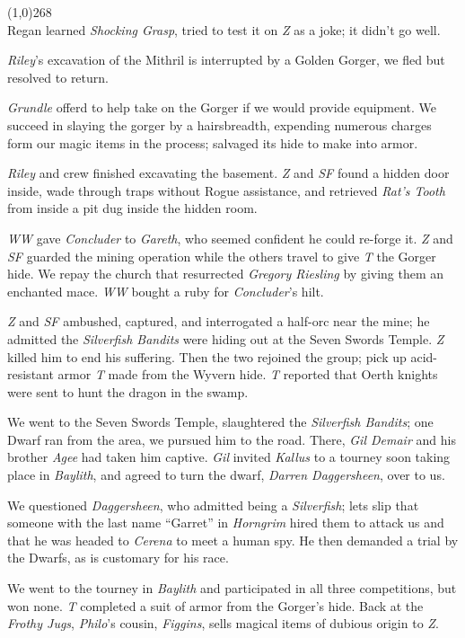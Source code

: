 \documentclass[letterpaper]{article}
\newcommand{\colline}{\noindent\line(1,0){268} \\}
\newcommand{\e}[1]{\emph{#1}}
\newcommand{\B}[1]{\textbf{#1}}
\newenvironment{notesection}[1]
{\noindent {\huge \B{#1}} \par
\vspace{-0.75em}
\colline
\begingroup\fontsize{9pt}{12pt}\selectfont}
{\endgroup}
\begin{document}
\begin{notesection}{Events}
Regan learned \e{Shocking Grasp}, tried to test it on \e{Z} as a joke; it didn't go well.

\e{Riley}'s excavation of the Mithril is interrupted by a Golden Gorger, we fled but resolved to return.

\e{Grundle} offerd to help take on the Gorger if we would provide equipment. We succeed in slaying the gorger by a hairsbreadth, expending numerous charges form our magic items in the process; salvaged its hide to make into armor.

\e{Riley} and crew finished excavating the basement. \e{Z} and \e{SF} found a hidden door inside, wade through traps without Rogue assistance, and retrieved \e{Rat's Tooth} from inside a pit dug inside the hidden room.

\e{WW} gave \e{Concluder} to \e{Gareth}, who seemed confident he could re-forge it.  \e{Z} and \e{SF} guarded the mining operation while the others travel to give \e{T} the Gorger hide. We repay the church that resurrected \e{Gregory Riesling} by giving them an enchanted mace. \e{WW} bought a ruby for \e{Concluder}'s hilt.

\e{Z} and \e{SF} ambushed, captured, and interrogated a half-orc near the mine; he admitted the \e{Silverfish Bandits} were hiding out at the Seven Swords Temple. \e{Z} killed him to end his suffering. Then the two rejoined the group; pick up acid-resistant armor \e{T} made from the Wyvern hide.  \e{T} reported that Oerth knights were sent to hunt the dragon in the swamp.

We went to the Seven Swords Temple, slaughtered the \e{Silverfish Bandits}; one Dwarf ran from the area, we pursued him to the road. There, \e{Gil Demair} and his brother \e{Agee} had taken him captive. \e{Gil} invited \e{Kallus} to a tourney soon taking place in \e{Baylith}, and agreed to turn the dwarf, \e{Darren Daggersheen}, over to us.

We questioned \e{Daggersheen}, who admitted being a \e{Silverfish}; lets slip that someone with the last name ``Garret'' in \e{Horngrim} hired them to attack us and that he was headed to \e{Cerena} to meet a human spy.  He then demanded a trial by the Dwarfs, as is customary for his race.

We went to the tourney in \e{Baylith} and participated in all three competitions, but won none. \e{T} completed a suit of armor from the Gorger's hide. Back at the \e{Frothy Jugs}, \e{Philo}'s cousin, \e{Figgins}, sells magical items of dubious origin to \e{Z}.


\end{notesection}
\end{document}
